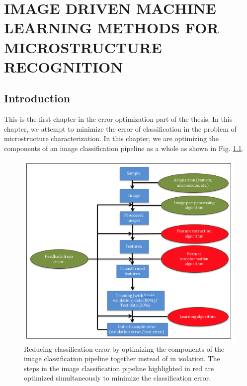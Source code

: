 \chapter{IMAGE DRIVEN MACHINE LEARNING METHODS FOR MICROSTRUCTURE RECOGNITION}
\label{chap:COMMAT}

\let\thefootnote\relax{}



\section{Introduction}
\label{intro}

This is the first chapter in the error optimization part of the thesis. In this chapter, we attempt to minimize the error of classification in the problem of microstructure characterization. In this chapter, we are optimizing the components of an image classification pipeline as a whole as shown in Fig. \ref{fig:chapter3}.

\begin{figure}[ht!]
\centering
\includegraphics[width=1.0\textwidth]{img/chapter3}
\caption{Reducing classification error by optimizing the components of the image classification pipeline together instead of in isolation. The steps in the image classification pipeline highlighted in red are optimized simultaneously to minimize the classification error.}
\label{fig:chapter3}
\end{figure}

